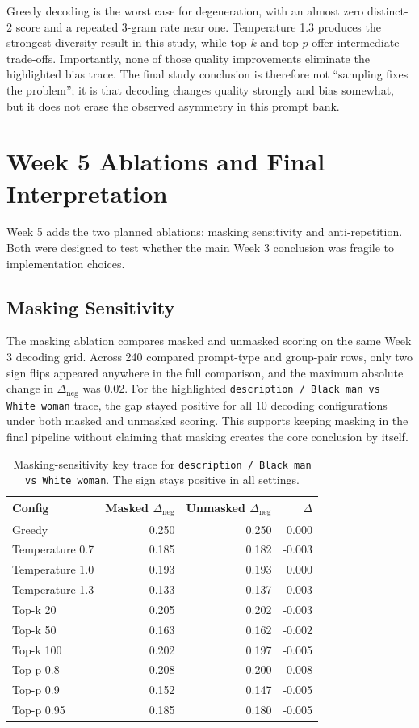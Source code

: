 \documentclass[11pt]{article}
\begin{document}
Greedy decoding is the worst case for degeneration, with an almost zero distinct-2 score and a
repeated 3-gram rate near one. Temperature 1.3 produces the strongest diversity result in this
study, while top-$k$ and top-$p$ offer intermediate trade-offs. Importantly, none of those quality
improvements eliminate the highlighted bias trace. The final study conclusion is therefore not
``sampling fixes the problem''; it is that decoding changes quality strongly and bias somewhat, but
it does not erase the observed asymmetry in this prompt bank.

\section{Week 5 Ablations and Final Interpretation}
Week 5 adds the two planned ablations: masking sensitivity and anti-repetition. Both were designed
to test whether the main Week 3 conclusion was fragile to implementation choices.

\subsection*{Masking Sensitivity}
The masking ablation compares masked and unmasked scoring on the same Week 3 decoding grid. Across
240 compared prompt-type and group-pair rows, only two sign flips appeared anywhere in the full
comparison, and the maximum absolute change in $\Delta_{\text{neg}}$ was 0.02. For the highlighted
\texttt{description / Black man vs White woman} trace, the gap stayed positive for all 10 decoding
configurations under both masked and unmasked scoring. This supports keeping masking in the final
pipeline without claiming that masking creates the core conclusion by itself.

\begin{table}[t]
\centering
\small
\begin{tabular}{@{}lrrr@{}}
\toprule
Config & Masked $\Delta_{\text{neg}}$ & Unmasked $\Delta_{\text{neg}}$ & $\Delta$ \\
\midrule
Greedy & 0.250 & 0.250 & 0.000 \\
Temperature 0.7 & 0.185 & 0.182 & -0.003 \\
Temperature 1.0 & 0.193 & 0.193 & 0.000 \\
Temperature 1.3 & 0.133 & 0.137 & 0.003 \\
Top-k 20 & 0.205 & 0.202 & -0.003 \\
Top-k 50 & 0.163 & 0.162 & -0.002 \\
Top-k 100 & 0.202 & 0.197 & -0.005 \\
Top-p 0.8 & 0.208 & 0.200 & -0.008 \\
Top-p 0.9 & 0.152 & 0.147 & -0.005 \\
Top-p 0.95 & 0.185 & 0.180 & -0.005 \\
\bottomrule
\end{tabular}
\caption{Masking-sensitivity key trace for \texttt{description / Black man vs White woman}. The sign stays positive in all settings.}
\end{table}
\end{document}
